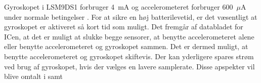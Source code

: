 Gyroskopet i LSM9DS1 forbruger 4~mA og accelerometeret forbruger 600~$\mu$A under normale betingelser \citep{Jimb02016}. For at sikre en høj batterilevetid, er det væsentligt at gyroskopet er aktiveret så kort tid som muligt. Det fremgår af databladet for ICen, at det er muligt at slukke begge sensorer, at benytte accelerometeret alene eller benytte accelerometeret og gyroskopet sammen. Det er dermed muligt, at benytte accelerometeret og gyroskopet skiftevis. Der kan yderligere spares strøm ved brug af gyroskopet, hvis der vælges en lavere samplerate. Disse apspekter vil blive omtalt i  samt \\ %
